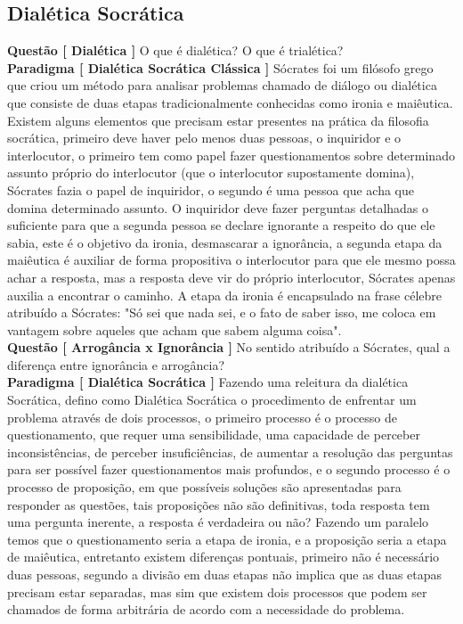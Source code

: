 \subsection{Dialética Socrática}

% 
\hspace{\baselineskip}



\textbf{Questão [ Dialética ]} O que é dialética? O que é trialética?\\

\textbf{Paradigma [ Dialética Socrática Clássica ]} Sócrates foi um filósofo grego que criou um método para analisar problemas chamado de diálogo ou dialética que consiste de duas etapas tradicionalmente conhecidas como ironia e maiêutica. Existem alguns elementos que precisam estar presentes na prática da filosofia socrática, primeiro deve haver pelo menos duas pessoas, o inquiridor e o interlocutor, o primeiro tem como papel fazer questionamentos sobre determinado assunto próprio do interlocutor (que o interlocutor supostamente domina), Sócrates fazia o papel de inquiridor, o segundo é uma pessoa que acha que domina determinado assunto. O inquiridor deve fazer perguntas detalhadas o suficiente para que a segunda pessoa se declare ignorante a respeito do que ele sabia, este é o objetivo da ironia, desmascarar a ignorância, a segunda etapa da maiêutica é auxiliar de forma propositiva o interlocutor para que ele mesmo possa achar a resposta, mas a resposta deve vir do próprio interlocutor, Sócrates apenas auxilia a encontrar o caminho. A etapa da ironia é encapsulado na frase célebre atribuído a Sócrates: "Só sei que nada sei, e o fato de saber isso, me coloca em vantagem sobre aqueles que acham que sabem alguma coisa".\\

\textbf{Questão [ Arrogância x Ignorância ]} No sentido atribuído a Sócrates, qual a diferença entre ignorância e arrogância? \\

\textbf{Paradigma [ Dialética Socrática ]} Fazendo uma releitura da dialética Socrática, defino como Dialética Socrática o procedimento de enfrentar um problema através de dois processos, o primeiro processo é o processo de questionamento, que requer uma sensibilidade, uma capacidade de perceber inconsistências, de perceber insuficiências, de aumentar a resolução das perguntas para ser possível fazer questionamentos mais profundos, e o segundo processo é o processo de proposição, em que possíveis soluções são apresentadas para responder as questões, tais proposições não são definitivas, toda resposta tem uma pergunta inerente, a resposta é verdadeira ou não? Fazendo um paralelo temos que o questionamento seria a etapa de ironia, e a proposição seria a etapa de maiêutica, entretanto existem diferenças pontuais, primeiro não é necessário duas pessoas, segundo a divisão em duas etapas não implica que as duas etapas precisam estar separadas, mas sim que existem dois processos que podem ser chamados de forma arbitrária de acordo com a necessidade do problema.\\

